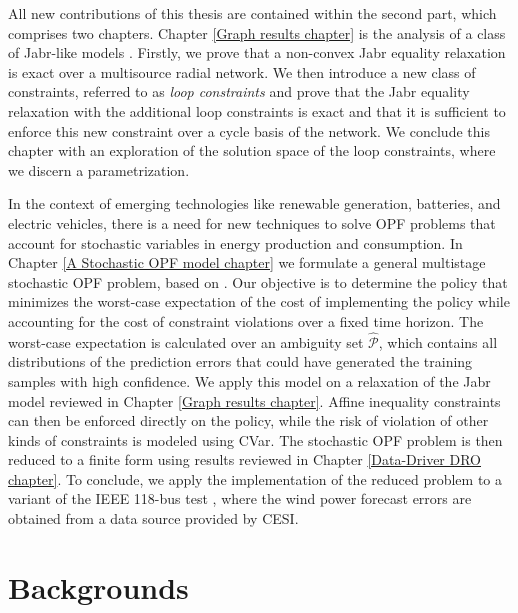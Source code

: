 \documentclass[11pt,a4paper,oneside,openany]{book}
\numberwithin{definition}{section}
\numberwithin{theorem}{section}
\numberwithin{problem}{section}
\begin{document}
All new contributions of this thesis are contained within the second part, which comprises two chapters.  Chapter \ref{Graph results chapter} is the analysis of a class of Jabr-like models \cite{jabr}. Firstly, we prove that a non-convex Jabr equality relaxation  is exact over a multisource radial network. We then introduce a new class of constraints, referred to as \emph{loop constraints} and prove that the Jabr equality relaxation with the additional loop constraints is exact and that it is sufficient to enforce this new constraint over a cycle basis of the network. We conclude this chapter with an exploration of the solution space of the loop constraints, where we discern a parametrization.
\par 
In the context of emerging technologies like renewable generation, batteries, and electric vehicles, there is a need for new techniques to solve OPF problems that account for stochastic variables in energy production and consumption. In Chapter \ref{A Stochastic OPF model chapter} we formulate a general multistage stochastic OPF problem, based on \cite{DBDRSOPF}. Our objective is to determine the policy that minimizes the worst-case expectation of the cost of implementing the policy while accounting for the cost of constraint violations over a fixed time horizon. The worst-case expectation is calculated over an ambiguity set $\hat{\mathcal{P}}$, which contains all distributions of the prediction errors that could have generated the training samples with high confidence. We apply this model on a relaxation of the Jabr model reviewed in Chapter \ref{Graph results chapter}. Affine inequality constraints can then be enforced directly on the policy, while the risk of violation of other kinds of constraints is modeled using CVar. The stochastic OPF problem is then reduced to a finite form using results reviewed in Chapter \ref{Data-Driver DRO chapter}. To conclude, we apply the implementation of the reduced problem to a variant of the IEEE 118-bus test \cite{DBDRSOPF2}, \cite{MATPOWER118bus} where the wind power forecast errors are obtained from a data source provided by CESI.

\newpage


\chapter{Backgrounds}
\end{document}
